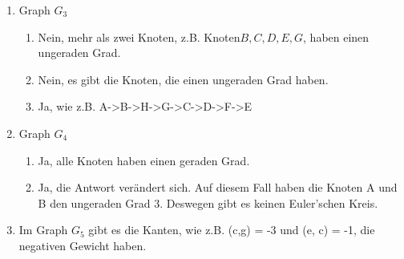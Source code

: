 \documentclass[12pt]{scrartcl}
\begin{document}
\setcounter{exnum}{4} %
\begin{enumerate}
  \item Graph $G_3$
  \begin{enumerate}
    \item Nein, mehr als zwei Knoten, z.B. Knoten$B, C, D, E, G$, haben einen ungeraden Grad.
    \item Nein, es gibt die Knoten, die einen ungeraden Grad haben.
    \item Ja, wie z.B. A->B->H->G->C->D->F->E
  \end{enumerate}
  \item Graph $G_4$\\
  \begin{enumerate}
    \item Ja, alle Knoten haben einen geraden Grad.
    \item Ja, die Antwort verändert sich. Auf diesem Fall haben die Knoten A und B den ungeraden Grad 3. Deswegen gibt es keinen Euler'schen Kreis.
  \end{enumerate}
  \item Im Graph $G_5$ gibt es die Kanten, wie z.B. (c,g) = -3 und (e, c) = -1, die negativen Gewicht haben.
\end{enumerate}
\end{document}
